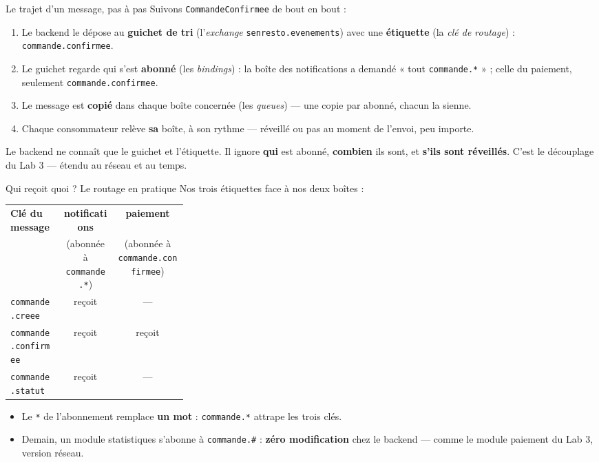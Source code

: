 \documentclass[aspectratio=169,11pt]{beamer}
\begin{document}
\begin{frame}{Le trajet d'un message, pas à pas}
{\small Suivons \texttt{CommandeConfirmee} de bout en bout :}
\begin{enumerate}\small
  \item Le backend le dépose au \textbf{guichet de tri} (l'\emph{exchange} \texttt{senresto.evenements}) avec une \textbf{étiquette} (la \emph{clé de routage}) : \texttt{commande.confirmee}.
  \item Le guichet regarde qui s'est \textbf{abonné} (les \emph{bindings}) : la boîte des notifications a demandé « tout \texttt{commande.*} » ; celle du paiement, seulement \texttt{commande.confirmee}.
  \item Le message est \textbf{copié} dans chaque boîte concernée (les \emph{queues}) — une copie par abonné, chacun la sienne.
  \item Chaque consommateur relève \textbf{sa} boîte, à son rythme — réveillé ou pas au moment de l'envoi, peu importe.
\end{enumerate}
\begin{ucadret}[À retenir]
{\small Le backend ne connaît que le guichet et l'étiquette. Il ignore \textbf{qui} est abonné, \textbf{combien} ils sont, et \textbf{s'ils sont réveillés}. C'est le découplage du Lab 3 — étendu au réseau et au temps.}
\end{ucadret}
\end{frame}

\begin{frame}{Qui reçoit quoi ? Le routage en pratique}
{\small Nos trois étiquettes face à nos deux boîtes :}
\vskip2pt
{\small\begin{tabular}{p{0.30\linewidth}cc}
\toprule
\textbf{Clé du message} & \textbf{notifications} & \textbf{paiement}\\
 & (abonnée à \texttt{commande.*}) & (abonnée à \texttt{commande.confirmee})\\
\midrule
\texttt{commande.creee} & reçoit & ---\\
\texttt{commande.confirmee} & reçoit & reçoit\\
\texttt{commande.statut} & reçoit & ---\\
\bottomrule
\end{tabular}}
\vskip4pt
\begin{itemize}\small
  \item Le \texttt{*} de l'abonnement remplace \textbf{un mot} : \texttt{commande.*} attrape les trois clés.
  \item Demain, un module statistiques s'abonne à \texttt{commande.\#} : \textbf{zéro modification} chez le backend — comme le module paiement du Lab 3, version réseau.
\end{itemize}
\end{frame}
\end{document}
